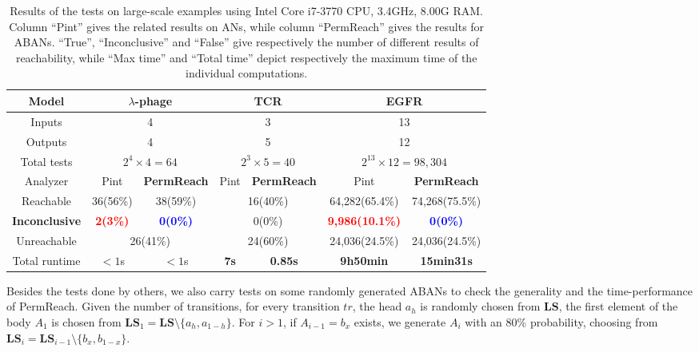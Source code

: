 \documentclass{article}
\theoremstyle{definition}
\begin{document}
\begin{table}[ht]
\centering
    \begin{tabular}{|c|c|c|c|c|c|c|}
    \hline
  	Model	&\multicolumn{2}{c|}{$\lambda$-phage}	&	  \multicolumn{2}{c|}{TCR} & \multicolumn{2}{c|}{EGFR}  \\
    \hline
    Inputs&\multicolumn{2}{c|}{4}	&	  \multicolumn{2}{c|}{3} & \multicolumn{2}{c|}{13}\\
    \hline
    Outputs&\multicolumn{2}{c|}{4} &	  \multicolumn{2}{c|}{5} & \multicolumn{2}{c|}{12} \\
    \hline
    Total tests&\multicolumn{2}{c|}{$2^4\times 4=64$} & \multicolumn{2}{c|}{$2^3\times 5=40$} & \multicolumn{2}{c|}{$2^{13}\times 12=98,304$}\\
    \hline
    Analyzer  &  Pint       &\textbf{PermReach}    &  Pint       &\textbf{PermReach}   &  Pint       &\textbf{PermReach}             \\
    \hline
    Reachable    & 36(56\%)& 38(59\%)   &  \multicolumn{2}{c|}{16(40\%)}  & 64,282(65.4\%)&74,268(75.5\%)\\
    \hline
    \textbf{Inconclusive} & \textcolor{red}{\textbf{2(3\%)}}&\textcolor{blue}{\textbf{0(0\%)}}& \multicolumn{2}{c|}{0(0\%)}    &\textcolor{red}{\textbf{9,986(10.1\%)}}&\textcolor{blue}{\textbf{0(0\%)}}  \\
    \hline
    Unreachable     &  \multicolumn{2}{c|}{26(41\%)} &  \multicolumn{2}{c|}{24(60\%)} &24,036(24.5\%)&24,036(24.5\%)\\
    \hline
    Total runtime &  $<1$s       &  $<1$s &  \textbf{7s}       &  \textbf{0.85s}        & \textbf{9h50min}              & \textbf{15min31s}      \\
    \hline
    \end{tabular}
\caption{Results of the tests on large-scale examples using Intel Core i7-3770 CPU, \@3.4GHz, 8.00G RAM. 
Column “Pint” gives the related results on ANs, while column “PermReach” gives the results for ABANs. 
“True”, “Inconclusive” and “False” give respectively the number of different results of reachability, while “Max time” and “Total time” depict respectively the maximum time of the individual computations.}
\label{tab:2}
\end{table}

Besides the tests done by others, we also carry tests on some randomly generated ABANs to check the generality and the time-performance of PermReach. 
Given the number of transitions, for every transition $tr$, the head $a_h$ is randomly chosen from $\mathbf{LS}$, the first element of the body $A_1$ is chosen from $\mathbf{LS}_1=\mathbf{LS}\setminus \{a_h,a_{1-h}\}$.
For $i>1$, if $A_{i-1}=b_x$ exists, we generate $A_i$ with an 80\% probability, choosing from $\mathbf{LS}_i=\mathbf{LS}_{i-1}\setminus \{b_x,b_{1-x}\}$. 
 
\end{document}
